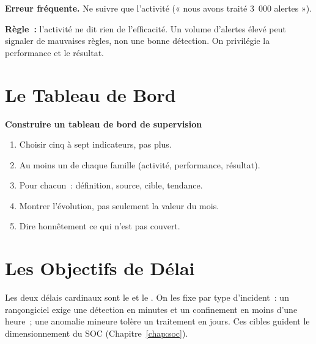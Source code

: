\begin{boxalert}
\textbf{Erreur fréquente.} Ne suivre que l'activité (« nous avons traité
3~000 alertes »).

\smallskip
\textbf{Règle~:} l'activité ne dit rien de l'efficacité. Un volume d'alertes
élevé peut signaler de mauvaises règles, non une bonne détection. On
privilégie la performance et le résultat.
\end{boxalert}

\section{Le Tableau de Bord}
\label{sec:c03-tdb}

\begin{boxprocedure}
\textbf{Construire un tableau de bord de supervision}
\begin{enumerate}
    \item Choisir cinq à sept indicateurs, pas plus.
    \item Au moins un de chaque famille (activité, performance, résultat).
    \item Pour chacun~: définition, source, cible, tendance.
    \item Montrer l'évolution, pas seulement la valeur du mois.
    \item Dire honnêtement ce qui n'est pas couvert.
\end{enumerate}
\end{boxprocedure}

\section{Les Objectifs de Délai}
\label{sec:c03-delais}

Les deux délais cardinaux sont le  et le
. On les fixe par type d'incident~: un
rançongiciel exige une détection en minutes et un confinement en moins d'une
heure~; une anomalie mineure tolère un traitement en jours. Ces cibles
guident le dimensionnement du SOC (Chapitre~\ref{chap:soc}).

